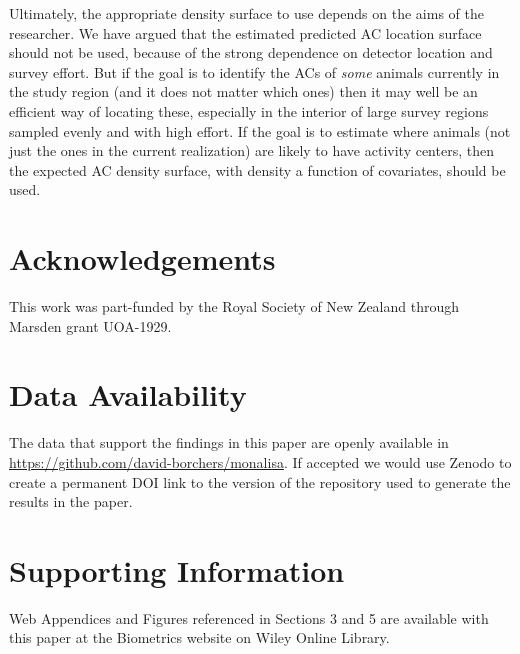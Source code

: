 \documentclass[useAMS,usenatbib,referee]{biom}
\begin{document}
Ultimately, the appropriate density surface to use depends on the aims of the researcher. We have argued that the estimated predicted AC location surface should not be used, because of the strong dependence on detector location and survey effort. But if the goal is to identify the ACs of {\it some} animals currently in the study region (and it does not matter which ones) then it may well be an efficient way of locating these, especially in the interior of large survey regions sampled evenly and with high effort. If the goal is to estimate where animals (not just the ones in the current realization) are likely to have activity centers, then the expected AC density surface, with density a function of covariates, should be used.

\section*{Acknowledgements}

This work was part-funded by the Royal Society of New Zealand through Marsden grant UOA-1929.

\section*{Data Availability}
The data that support the findings in this paper are openly available in \url{https://github.com/david-borchers/monalisa}. If accepted we would use Zenodo to create a permanent DOI link to the version of the repository used to generate the results in the paper.




\section*{Supporting Information}
Web Appendices and Figures referenced in Sections 3 and 5 are available with this paper at the Biometrics website on Wiley Online Library. 

\end{document}
